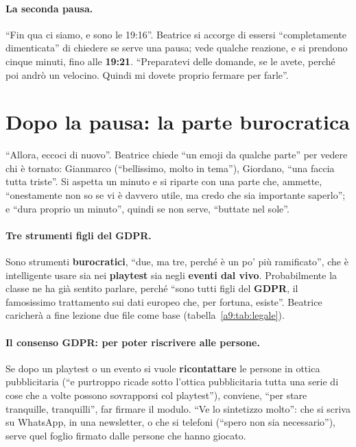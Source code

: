 \paragraph{La seconda pausa.} ``Fin qua ci siamo, e sono le 19:16''. Beatrice si
accorge di essersi ``completamente dimenticata'' di chiedere se serve una pausa; vede
qualche reazione, e si prendono cinque minuti, fino alle \textbf{19:21}. ``Preparatevi
delle domande, se le avete, perché poi andrò un velocino. Quindi mi dovete proprio
fermare per farle''.

\section{Dopo la pausa: la parte burocratica}
\label{a9:sec:burocrazia}



``Allora, eccoci di nuovo''. Beatrice chiede ``un emoji da qualche parte'' per vedere
chi è tornato: Gianmarco (``bellissimo, molto in tema''), Giordano, ``una faccia tutta
triste''. Si aspetta un minuto e si riparte con una parte che, ammette,
``onestamente non so se vi è davvero utile, ma credo che sia importante saperlo''; e
``dura proprio un minuto'', quindi se non serve, ``buttate nel sole''.

\paragraph{Tre strumenti figli del GDPR.} Sono strumenti \textbf{burocratici}, ``due,
ma tre, perché è un po' più ramificato'', che è intelligente usare sia nei
\textbf{playtest} sia negli \textbf{eventi dal vivo}. Probabilmente la classe ne ha già
sentito parlare, perché ``sono tutti figli del \textbf{GDPR}, il famosissimo
trattamento sui dati europeo che, per fortuna, esiste''. Beatrice caricherà a fine
lezione due file come base (tabella~\ref{a9:tab:legale}).

\paragraph{Il consenso GDPR: per poter riscrivere alle persone.} Se dopo un playtest
o un evento si vuole \textbf{ricontattare} le persone in ottica pubblicitaria (``e
purtroppo ricade sotto l'ottica pubblicitaria tutta una serie di cose che a volte
possono sovrapporsi col playtest''), conviene, ``per stare tranquille, tranquilli'',
far firmare il modulo. ``Ve lo sintetizzo molto'': che si scriva su WhatsApp, in una
newsletter, o che si telefoni (``spero non sia necessario''), serve quel foglio firmato
dalle persone che hanno giocato.

